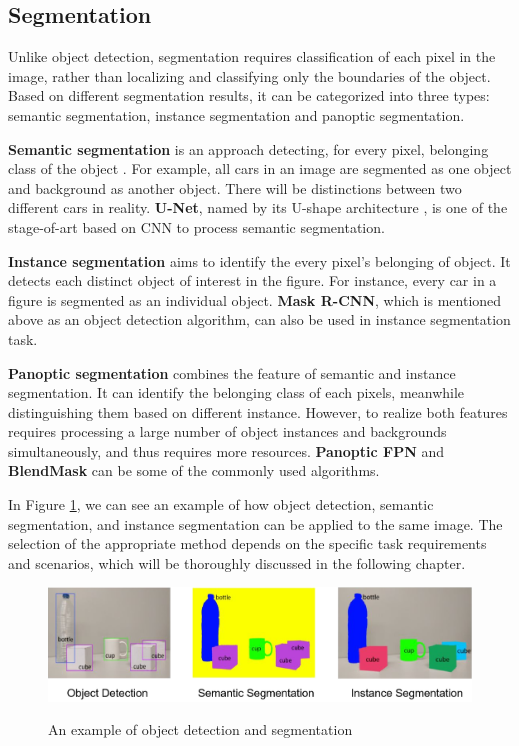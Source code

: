 \subsection{Segmentation}

Unlike object detection, segmentation requires classification of each pixel in the image, rather than localizing and classifying only the boundaries of the object. Based on different 
segmentation results, it can be categorized into three types: semantic segmentation, instance segmentation and panoptic segmentation.

\textbf{Semantic segmentation} is an approach detecting, for every pixel, belonging class of the object \cite{guo2019degraded}. For example, all cars in an image are segmented as one object and background as another object. There will be distinctions between two different cars in reality. \textbf{U-Net}, named by its U-shape architecture \cite{ronneberger2015u}, is one of the stage-of-art based on CNN to process semantic segmentation.

\textbf{Instance segmentation} aims to identify the every pixel's belonging of object. It detects each distinct object of interest in the figure. For instance, every car in a figure is segmented as an individual object. \textbf{Mask R-CNN}, which is mentioned above as an object detection algorithm, can also be used in instance segmentation task. 

\textbf{Panoptic segmentation} combines the feature of semantic and instance segmentation. It can identify the belonging class of each pixels, meanwhile distinguishing them based on different instance. However, to realize both features requires processing a large number of object instances and backgrounds simultaneously, and thus requires more resources. \textbf{Panoptic FPN} and \textbf{BlendMask} can be some of the commonly used algorithms.

In Figure \ref{fig:7}, we can see an example of how object detection, semantic segmentation, and instance segmentation can be applied to the same image. The selection of the appropriate method depends on the specific task requirements and scenarios, which will be thoroughly discussed in the following chapter.
\begin{figure}[h]
  \centering
  \includegraphics[width=1\textwidth]{Figures/Object detection and segmentation.png}
  \caption{An example of object detection and segmentation}
  \cite{nitish_2017}
  \label{fig:7}
\end{figure} 
